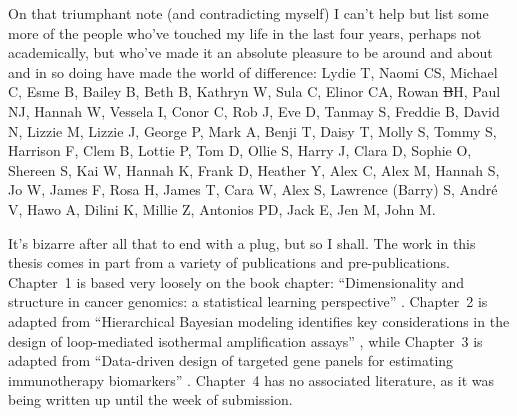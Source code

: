 \documentclass[../thesis.tex]{subfiles}
\begin{document}
On that triumphant note (and contradicting myself) I can't help but list some more of the people who've touched my life in the last four years, perhaps not academically, but who've made it an absolute pleasure to be around and about and in so doing have made the world of difference: Lydie T, Naomi CS, Michael C, Esme B, Bailey B, Beth B, Kathryn W, Sula C, Elinor CA, Rowan \st{B}H, Paul NJ, Hannah W, Vessela I, Conor C, Rob J, Eve D, Tanmay S, Freddie B, David N, Lizzie M, Lizzie J, George P, Mark A, Benji T, Daisy T, Molly S, Tommy S, Harrison F, Clem B, Lottie P, Tom D, Ollie S, Harry J, Clara D, Sophie O, Shereen S, Kai W, Hannah K, Frank D, Heather Y, Alex C, Alex M, Hannah S, Jo W, James F, Rosa H, James T, Cara W, Alex S, Lawrence (Barry) S, André V, Hawo A, Dilini K, Millie Z, Antonios PD, Jack E, Jen M, John M.

It's bizarre after all that to end with a plug, but so I shall. The work in this thesis comes in part from a variety of publications and pre-publications. Chapter~1 is based very loosely on the book chapter: ``Dimensionality and structure in cancer genomics: a statistical learning perspective'' \citep{bradley_dimensionality_2020}. Chapter~2 is adapted from ``Hierarchical Bayesian modeling identifies key considerations in the design of loop-mediated isothermal amplification assays'' \citep{bradley_hierarchical_2023}, while Chapter~3 is adapted from ``Data-driven design of targeted gene panels for estimating immunotherapy biomarkers'' \citep{bradley_data-driven_2021, bradley_data-driven_2022}. Chapter~4 has no associated literature, as it was being written up until the week of submission.
\end{document}
